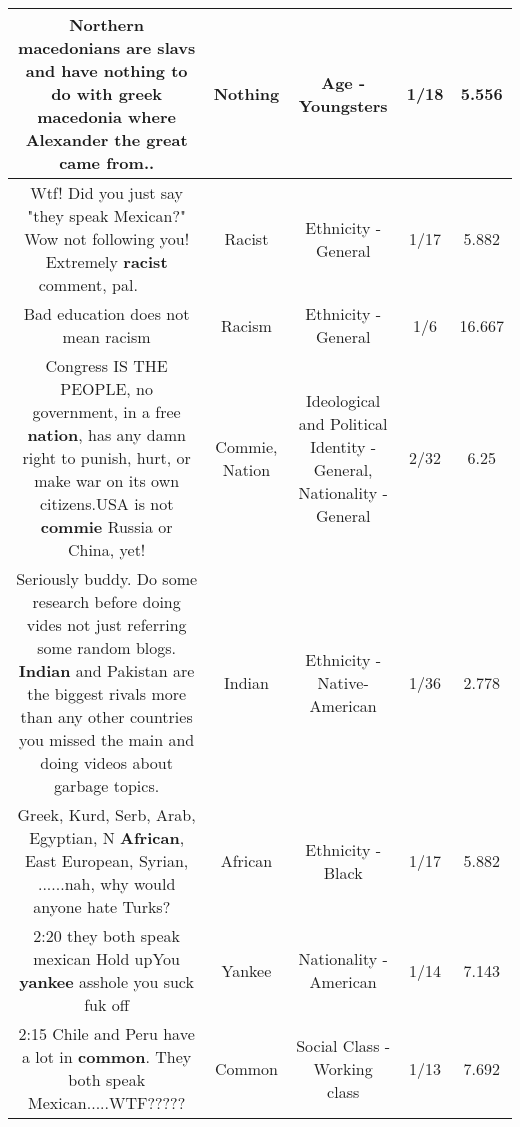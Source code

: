 \documentclass[11pt]{article}
\newlength\mylength
\begin{document}
\begin{center}
\begin{longtable}{|C{.65\mylength}|C{.30\mylength}|C{.12\mylength}|C{.12\mylength}|C{.12\mylength}|}
  \small Northern macedonians are slavs and have \textbf{nothing} to do with greek macedonia where Alexander the great came from..\normalsize   & Nothing & Age - Youngsters & 1/18 & 5.556 \\  \hline
  \small Wtf! Did you just say "they speak Mexican?" Wow not following you! Extremely \textbf{racist} comment, pal. 🤦🏻‍♂️🤨🧐🙄😲\normalsize   & Racist & Ethnicity - General & 1/17 & 5.882 \\  \hline
  \small Bad education does not mean racism\normalsize   & Racism & Ethnicity - General & 1/6 & 16.667 \\  \hline
  \small Congress IS THE PEOPLE, no government, in a free \textbf{nation}, has any damn right to punish, hurt, or make war on its own citizens.USA is not \textbf{commie} Russia or China, yet!\normalsize   & Commie, Nation &  Ideological and Political Identity - General, Nationality - General & 2/32 & 6.25 \\  \hline
  \small Seriously buddy. Do some research before doing vides not just referring some random blogs. \textbf{Indian} and Pakistan are the biggest rivals more than any other countries you missed the main and doing videos about garbage topics.\normalsize   & Indian & Ethnicity - Native-American & 1/36 & 2.778 \\  \hline
  \small Greek, Kurd, Serb, Arab, Egyptian, N \textbf{African}, East European, Syrian, ......nah, why would anyone hate Turks? 👐\normalsize   & African & Ethnicity - Black & 1/17 & 5.882 \\  \hline
  \small 2:20 they both speak mexican Hold upYou \textbf{yankee} asshole you suck fuk off\normalsize   & Yankee & Nationality - American & 1/14 & 7.143 \\  \hline
  \small 2:15 Chile and Peru have a lot in \textbf{common}. They both speak Mexican.....WTF?????\normalsize   & Common & Social Class - Working class & 1/13 & 7.692 \\  \hline

\end{longtable}
\end{center}
\end{document}
